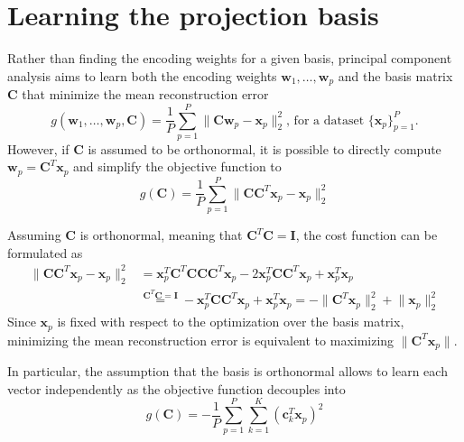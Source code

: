 \documentclass{report}
\begin{document}
\section{Learning the projection basis}
Rather than finding the encoding weights for a given basis, principal component analysis aims to learn both the encoding weights $\displaystyle \mathbf{w}_1, \dots, \mathbf{w}_p$ and the basis matrix $\displaystyle \mathbf{C}$ that minimize the mean reconstruction error
\[g(\mathbf{w}_1, \dots, \mathbf{w}_p, \mathbf{C}) = \frac{1}{P}\sum_{p = 1}^P \lVert \mathbf{Cw}_p - \mathbf{x}_p \lVert_2^2 \text{, for a dataset $\{\mathbf{x}_p\}_{p = 1}^P$.}\]
However, if $\displaystyle \mathbf{C}$ is assumed to be orthonormal, it is possible to directly compute $\displaystyle \mathbf{w}_p = \mathbf{C}^T\mathbf{x}_p$ and simplify the objective function to
\[g(\mathbf{C}) = \frac{1}{P}\sum_{p = 1}^P \lVert \mathbf{CC}^T\mathbf{x}_p - \mathbf{x}_p \rVert_2^2\]
\begin{proofbox}
    Assuming $\displaystyle \mathbf{C}$ is orthonormal, meaning that $\displaystyle \mathbf{C}^T\mathbf{C} = \mathbf{I}$, the cost function can be formulated as
    \begin{align*}
        \lVert \mathbf{CC}^T\mathbf{x}_p - \mathbf{x}_p \rVert_2^2
            &= \mathbf{x}_p^T\mathbf{C}^T\mathbf{CCC}^T\mathbf{x}_p -2\mathbf{x}_p^T\mathbf{CC}^T\mathbf{x}_p + \mathbf{x}_p^T\mathbf{x}_p \\
            &\stackrel{\mathbf{C}^T\mathbf{C} = \mathbf{I}}{=} -\mathbf{x}_p^T\mathbf{CC}^T\mathbf{x}_p + \mathbf{x}_p^T\mathbf{x}_p = -\lVert \mathbf{C}^T\mathbf{x}_p \rVert_2^2 + \lVert \mathbf{x}_p \rVert_2^2
    \end{align*}
    Since $\displaystyle \mathbf{x}_p$ is fixed with respect to the optimization over the basis matrix, minimizing the mean reconstruction error is equivalent to maximizing $\displaystyle \lVert \mathbf{C}^T\mathbf{x}_p \rVert$.
\end{proofbox}
\noindent In particular, the assumption that the basis is orthonormal allows to learn each vector independently as the objective function decouples into
\[g(\mathbf{C}) = -\frac{1}{P}\sum_{p = 1}^P\sum_{k = 1}^K (\mathbf{c}_k^T\mathbf{x}_p)^2\]
\end{document}
